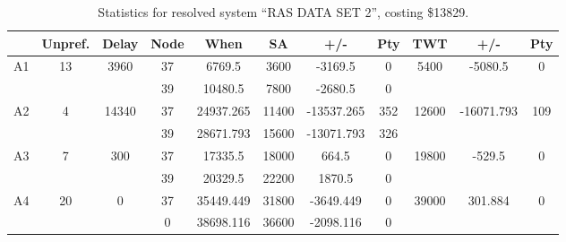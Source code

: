 \begin{table}
\caption{Statistics for resolved system ``RAS DATA SET 2'', costing \$13829.}
\begin{tabular}{c||c|c||c|c|c|c|c||c|c|c}
  \hline \hline
  &
  Unpref. & 
  Delay &
  Node &
  When &
  SA &
  +/- &
  Pty &
  TWT &
  +/- &
  Pty \\
      \hline
      \multirow{2}{*}{A1} &
      \multirow{2}{*}{13} &
      \multirow{2}{*}{3960} &
      37 &
      6769.5 &
      3600 &
        -3169.5 &
        0 &
      \multirow{2}{*}{5400} &
        \multirow{2}{*}{-5080.5} &
        \multirow{2}{*}{0}
      \\
      \cline{4-8}
       &
       &
       &
      39 &
      10480.5 &
      7800 &
        -2680.5 &
        0 &
      
         &
        
      \\
      \hline
      \multirow{2}{*}{A2} &
      \multirow{2}{*}{4} &
      \multirow{2}{*}{14340} &
      37 &
      24937.265 &
      11400 &
        -13537.265 &
        352 &
      \multirow{2}{*}{12600} &
        \multirow{2}{*}{-16071.793} &
        \multirow{2}{*}{109}
      \\
      \cline{4-8}
       &
       &
       &
      39 &
      28671.793 &
      15600 &
        -13071.793 &
        326 &
      
         &
        
      \\
      \hline
      \multirow{2}{*}{A3} &
      \multirow{2}{*}{7} &
      \multirow{2}{*}{300} &
      37 &
      17335.5 &
      18000 &
        664.5 &
        0 &
      \multirow{2}{*}{19800} &
        \multirow{2}{*}{-529.5} &
        \multirow{2}{*}{0}
      \\
      \cline{4-8}
       &
       &
       &
      39 &
      20329.5 &
      22200 &
        1870.5 &
        0 &
      
         &
        
      \\
      \hline
      \multirow{2}{*}{A4} &
      \multirow{2}{*}{20} &
      \multirow{2}{*}{0} &
      37 &
      35449.449 &
      31800 &
        -3649.449 &
        0 &
      \multirow{2}{*}{39000} &
        \multirow{2}{*}{301.884} &
        \multirow{2}{*}{0}
      \\
      \cline{4-8}
       &
       &
       &
      0 &
      38698.116 &
      36600 &
        -2098.116 &
        0 &
      

\end{tabular}
\end{table}
